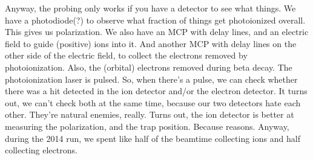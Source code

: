 
Anyway, the probing only works if you have a detector to see what things.  We have a photodiode(?) to observe what fraction of things get photoionized overall.  This gives us polarization.  We also have an MCP with delay lines, and an electric field to guide (positive) ions into it.  And another MCP with delay lines on the other side of the electric field, to collect the electrons removed by photoionization.  Also, the (orbital) electrons removed during beta decay.  The photoionization laser is pulsed.  So, when there's a pulse, we can check whether there was a hit detected in the ion detector and/or the electron detector.  It turns out, we can't check both at the same time, because our two detectors hate each other.  They're natural enemies, really.  Turns out, the ion detector is better at measuring the polarization, and the trap position.  Because reasons.    Anyway, during the 2014 run, we spent like half of the beamtime collecting ions and half collecting electrons.  



